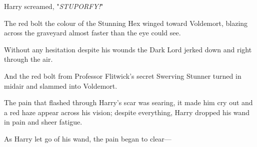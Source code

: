 Harry screamed, "\emph{STUPORFY!}"

The red bolt the colour of the Stunning Hex winged toward Voldemort, blazing
across the graveyard almost faster than the eye could see.

Without any hesitation despite his wounds the Dark Lord jerked down and right
through the air.

And the red bolt from Professor Flitwick's secret Swerving Stunner turned in
midair and slammed into Voldemort.

The pain that flashed through Harry's scar was searing, it made him cry out and
a red haze appear across his vision; despite everything, Harry dropped his wand
in pain and sheer fatigue.

As Harry let go of his wand, the pain began to clear---
